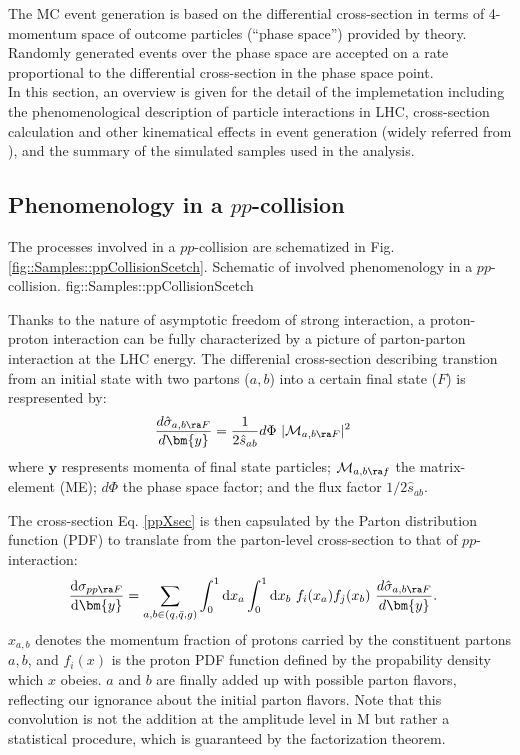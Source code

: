 The MC event generation is based on the differential cross-section in terms of 4-momentum space of outcome particles (``phase space'') provided by theory. Randomly generated events over the phase space are accepted on a rate proportional to the differential cross-section in the phase space point. \\

In this section, an overview is given for the detail of the implemetation including the phenomenological description of particle interactions in LHC, cross-section calculation and other kinematical effects in event generation (widely referred from \cite{ATLAS_generator}\cite{SkandsQCD}), and the summary of the simulated samples used in the analysis.  \\


\subsection{Phenomenology in a $pp$-collision}
The processes involved in a $pp$-collision are schematized in Fig. \ref{fig::Samples::ppCollisionScetch}.
{Schematic of involved phenomenology in a $pp$-collision.}
{fig::Samples::ppCollisionScetch}

Thanks to the nature of asymptotic freedom of strong interaction, a proton-proton interaction can be fully characterized by a picture of parton-parton interaction at the LHC energy. 
The differenial cross-section describing transtion from an initial state with two partons ($a, b$) into a certain final state ($F$) is respresented by: 
\begin{align}
\frac{d\hat{\sigma}_{a,b \ra F}}{d\bm{y}} & = \frac{1}{2 \hat{s}_{ab}} d\Phi \,\, |\mathcal{M}_{a,b \ra F}|^2  
\label{ppXsec}
\end{align}
where $\bm{y}$ respresents momenta of final state particles; $\mathcal{M}_{a,b \ra f}$ the matrix-element (ME); $d\Phi$ the phase space factor; and the flux factor $1/2\hat{s}_{ab}$.

The cross-section Eq. \ref{ppXsec} is then capsulated by the Parton distribution function (PDF) to translate from the parton-level cross-section to that of $pp$-interaction:
\begin{align}
\frac{\mathrm{d}\sigma_{pp\ra F}}{\mathrm{d}\bm{y}} & = \sum_{a,b\in (q,\bar{q},g)} \int_0^1 \mathrm{d}x_a \int_0^1 \mathrm{d}x_b \,\, f_i (x_a) f_j (x_b) \,\, \frac{d\hat{\sigma}_{a,b \ra F}}{d\bm{y}}.
\label{ppXsecWithPDF}
\end{align}
$x_{a,b}$ denotes the momentum fraction of protons carried by the constituent partons $a,b$, and $f_i(x)$ is the proton PDF function defined by the propability density which $x$ obeies. $a$ and $b$ are finally added up with possible parton flavors, reflecting our ignorance about the initial parton flavors.
Note that this convolution is not the addition at the amplitude level in $\mathrm{M}$ but rather a statistical procedure, which is guaranteed by the factorization theorem. \\

